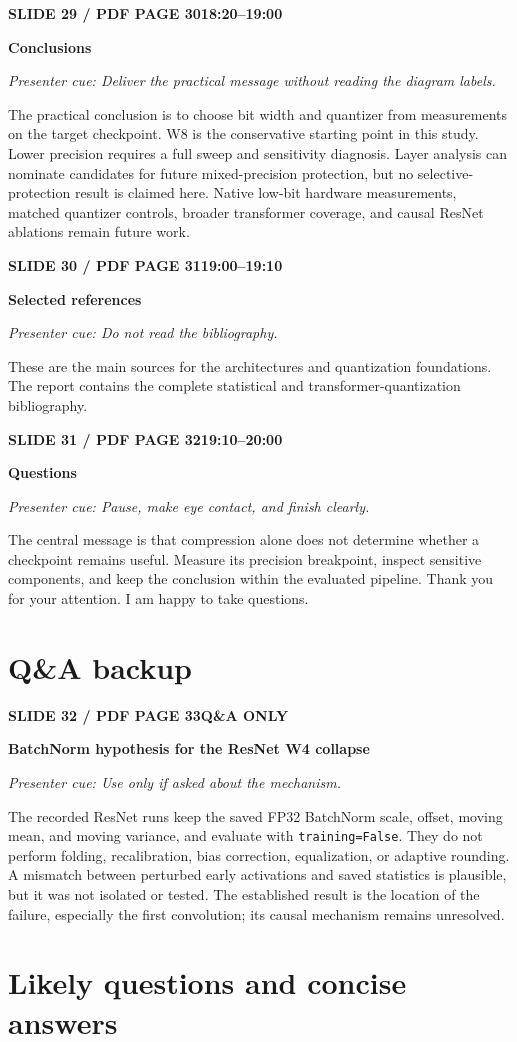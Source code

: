 \documentclass[11pt,a4paper]{article}
\newcommand{\slidetitle}[3]{%
  \vspace{2mm}\noindent
  \colorbox{TUblue}{\parbox{\dimexpr\textwidth-2\fboxsep}{\color{white}\bfseries #1\hfill #2}}%
  \par\textcolor{TUorange}{\bfseries #3}\par
}
\newcommand{\cue}[1]{\textit{\textcolor{TUblue}{Presenter cue: #1}}\par}
\newcommand{\spoken}[1]{#1\par}
\begin{document}
\slidetitle{SLIDE 29 / PDF PAGE 30}{18:20--19:00}{Conclusions}
\cue{Deliver the practical message without reading the diagram labels.}
\spoken{The practical conclusion is to choose bit width and quantizer from measurements on the target checkpoint. W8 is the conservative starting point in this study. Lower precision requires a full sweep and sensitivity diagnosis. Layer analysis can nominate candidates for future mixed-precision protection, but no selective-protection result is claimed here. Native low-bit hardware measurements, matched quantizer controls, broader transformer coverage, and causal ResNet ablations remain future work.}

\slidetitle{SLIDE 30 / PDF PAGE 31}{19:00--19:10}{Selected references}
\cue{Do not read the bibliography.}
\spoken{These are the main sources for the architectures and quantization foundations. The report contains the complete statistical and transformer-quantization bibliography.}

\slidetitle{SLIDE 31 / PDF PAGE 32}{19:10--20:00}{Questions}
\cue{Pause, make eye contact, and finish clearly.}
\spoken{The central message is that compression alone does not determine whether a checkpoint remains useful. Measure its precision breakpoint, inspect sensitive components, and keep the conclusion within the evaluated pipeline. Thank you for your attention. I am happy to take questions.}

\section*{Q\&A backup}

\slidetitle{SLIDE 32 / PDF PAGE 33}{Q\&A ONLY}{BatchNorm hypothesis for the ResNet W4 collapse}
\cue{Use only if asked about the mechanism.}
\spoken{The recorded ResNet runs keep the saved FP32 BatchNorm scale, offset, moving mean, and moving variance, and evaluate with \texttt{training=False}. They do not perform folding, recalibration, bias correction, equalization, or adaptive rounding. A mismatch between perturbed early activations and saved statistics is plausible, but it was not isolated or tested. The established result is the location of the failure, especially the first convolution; its causal mechanism remains unresolved.}

\section*{Likely questions and concise answers}
\end{document}
